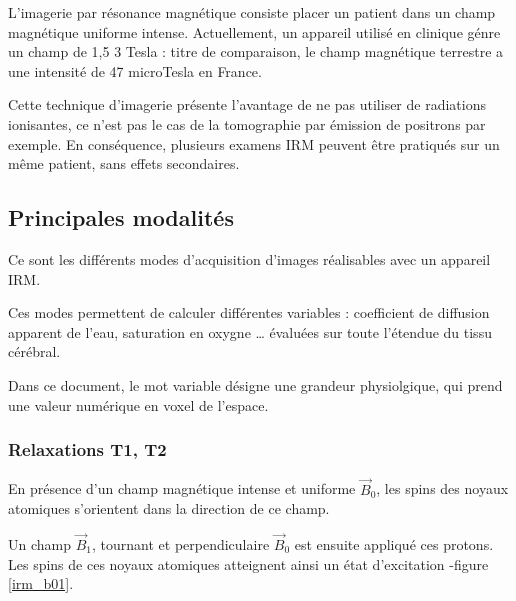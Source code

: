 L'imagerie par r\'esonance magn\'etique consiste  placer un patient dans un champ magn\'etique uniforme intense. %
Actuellement, un appareil utilis\'e en clinique g\'enre un champ de 1,5  3 Tesla : %
 titre de comparaison, le champ magn\'etique terrestre a une intensit\'e de 47 microTesla en France.

\par
Cette technique d'imagerie pr\'esente l'avantage de ne pas utiliser de radiations ionisantes, %
ce n'est pas le cas de la tomographie par \'emission de positrons par exemple. %
En cons\'equence, plusieurs examens IRM peuvent \^etre pratiqu\'es sur un m\^eme patient, sans effets secondaires.

\subsection{Principales modalit\'es}

Ce sont les diff\'erents modes d'acquisition d'images r\'ealisables avec un appareil IRM.

\par
Ces modes permettent de calculer diff\'erentes variables : %
coefficient de diffusion apparent de l'eau, saturation en oxygne \dots %
\'evalu\'ees sur toute l'\'etendue du tissu c\'er\'ebral.

\par
Dans ce document, le mot variable d\'esigne une grandeur physiolgique, qui prend une valeur num\'erique en voxel de l'espace.

\subsubsection{Relaxations T1, T2}


En pr\'esence d'un champ magn\'etique intense et uniforme $\vec{B}_0$, les spins des noyaux atomiques s'orientent dans la direction de ce champ.

\par
Un champ $\vec{B}_1$, tournant et perpendiculaire  $\vec{B}_0$ est ensuite appliqu\'e  ces protons. %
Les spins de ces noyaux atomiques atteignent ainsi un \'etat d'excitation -figure \ref{irm_b01}.

